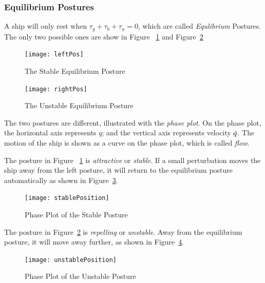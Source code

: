\subsubsection*{Equilibrium Postures}
A ship will only rest when $\tau_{g}+\tau_{b}+\tau_{u}=0$, which are called \emph{Equlibrium} Postures.
The only two possible ones are show in Figure ~\ref{fig:ShipEqulibriumStable} and Figure~\ref{fig:ShipEqulibriumUnstable}
\begin{figure}[!htbp]
  \begin{center}
     \texttt{[image: leftPos]}
    \caption{The Stable Equilibrium Posture}
    \label{fig:ShipEqulibriumStable}
  \end{center}
\end{figure}

\begin{figure}[!htbp]
  \begin{center}
     \texttt{[image: rightPos]}
    \caption{The Unstable Equilibrium Posture}
    \label{fig:ShipEqulibriumUnstable}
  \end{center}
\end{figure}



The two postures are different, illustrated with the \emph{phase plot}.
On the phase plot, the horizontal axis represents  $q$; and the vertical axis represents velocity $\dot{q}$. 
The motion of the ship is shown as a curve on the phase plot, which is called \emph{flow}.

The posture in Figure ~\ref{fig:ShipEqulibriumStable} is \emph{attractive} or \emph{stable}.
If a small perturbation moves the ship away from the left posture, it will return to the equilibrium posture automatically as shown in Figure~\ref{fig:StablePosture}.
\begin{figure}[!htbp]
  \begin{center}
      \texttt{[image: stablePosition]}
    \caption{Phase Plot of the Stable Posture}
    \label{fig:StablePosture}
  \end{center}
\end{figure}


The  posture in Figure~\ref{fig:ShipEqulibriumUnstable} is \emph{repelling} or \emph{unstable}.
Away from the equilibrium posture, it will move away further, as shown in Figure~\ref{fig:unStablePosture}.

\begin{figure}[!htbp]
  \begin{center}
      \texttt{[image: unstablePosition]}
    \caption{Phase Plot of the Unstable Posture}
    \label{fig:unStablePosture}
  \end{center}
\end{figure}



